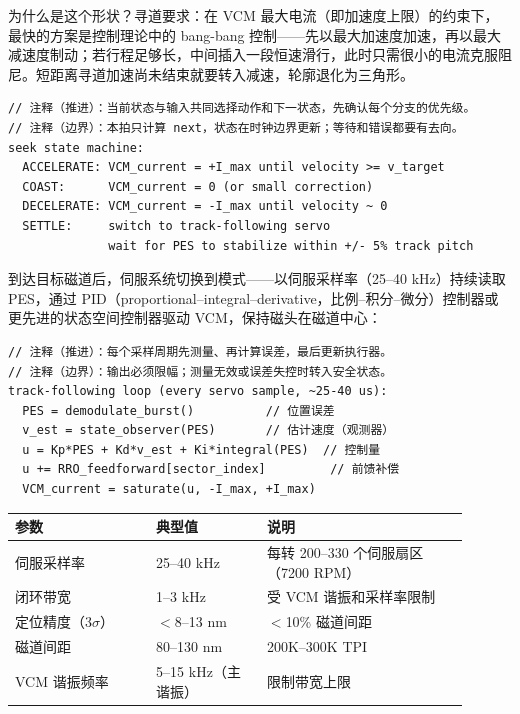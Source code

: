 为什么是这个形状？寻道要求：在 VCM 最大电流（即加速度上限）的约束下，最快的方案是控制理论中的 bang-bang 控制——先以最大加速度加速，再以最大减速度制动；若行程足够长，中间插入一段恒速滑行，此时只需很小的电流克服阻尼。短距离寻道加速尚未结束就要转入减速，轮廓退化为三角形。

\begin{lstlisting}
// 注释（推进）：当前状态与输入共同选择动作和下一状态，先确认每个分支的优先级。
// 注释（边界）：本拍只计算 next，状态在时钟边界更新；等待和错误都要有去向。
seek state machine:
  ACCELERATE: VCM_current = +I_max until velocity >= v_target
  COAST:      VCM_current = 0 (or small correction)
  DECELERATE: VCM_current = -I_max until velocity ~ 0
  SETTLE:     switch to track-following servo
              wait for PES to stabilize within +/- 5% track pitch
\end{lstlisting}


到达目标磁道后，伺服系统切换到模式——以伺服采样率（25--40 kHz）持续读取 PES，通过 PID（proportional--integral--derivative，比例--积分--微分）控制器或更先进的状态空间控制器驱动 VCM，保持磁头在磁道中心：

\begin{lstlisting}
// 注释（推进）：每个采样周期先测量、再计算误差，最后更新执行器。
// 注释（边界）：输出必须限幅；测量无效或误差失控时转入安全状态。
track-following loop (every servo sample, ~25-40 us):
  PES = demodulate_burst()          // 位置误差
  v_est = state_observer(PES)       // 估计速度（观测器）
  u = Kp*PES + Kd*v_est + Ki*integral(PES)  // 控制量
  u += RRO_feedforward[sector_index]         // 前馈补偿
  VCM_current = saturate(u, -I_max, +I_max)
\end{lstlisting}

\begin{longtable}{L{0.28\linewidth}L{0.22\linewidth}L{0.4\linewidth}}
\toprule
参数 & 典型值 & 说明 \\
\midrule
伺服采样率 & 25--40 kHz & 每转 200--330 个伺服扇区（7200 RPM） \\\tablerowrule
闭环带宽 & 1--3 kHz & 受 VCM 谐振和采样率限制 \\\tablerowrule
定位精度（3$\sigma$） & $<$8--13 nm & $<$10\% 磁道间距 \\\tablerowrule
磁道间距 & 80--130 nm & 200K--300K TPI \\\tablerowrule
VCM 谐振频率 & 5--15 kHz（主谐振） & 限制带宽上限 \\
\bottomrule
\end{longtable}

